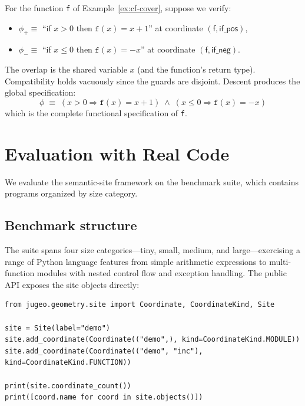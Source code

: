 \documentclass[11pt]{article}
\begin{document}
\begin{example}
For the function \texttt{f} of Example~\ref{ex:cf-cover}, suppose we verify:
\begin{itemize}[nosep]
  \item $\phi_+ \equiv$ ``if $x > 0$ then $\mathtt{f}(x) = x + 1$'' at
        coordinate $(\mathsf{f}, \mathsf{if\_pos})$,
  \item $\phi_- \equiv$ ``if $x \leq 0$ then $\mathtt{f}(x) = -x$'' at
        coordinate $(\mathsf{f}, \mathsf{if\_neg})$.
\end{itemize}
The overlap is the shared variable $x$ (and the function's return type).
Compatibility holds vacuously since the guards are disjoint.  Descent
produces the global specification:
\[
  \phi \;\equiv\; (x > 0 \Rightarrow \mathtt{f}(x) = x + 1) \;\wedge\;
                  (x \leq 0 \Rightarrow \mathtt{f}(x) = -x)
\]
which is the complete functional specification of \texttt{f}.
\end{example}

\section{Evaluation with Real Code}\label{sec:evaluation}

We evaluate the semantic-site framework on the \JuGeo{} benchmark suite,
which contains \compTotalPrograms{} programs organized by size category.

\subsection{Benchmark structure}

The suite spans four size categories---tiny, small, medium, and
large---exercising a range of Python language features from simple
arithmetic expressions to multi-function modules with nested control flow
and exception handling.
The public API exposes the site objects directly:

\begin{lstlisting}[style=jugeo-python,caption={A minimal semantic site in the public API.}]
from jugeo.geometry.site import Coordinate, CoordinateKind, Site

site = Site(label="demo")
site.add_coordinate(Coordinate(("demo",), kind=CoordinateKind.MODULE))
site.add_coordinate(Coordinate(("demo", "inc"), kind=CoordinateKind.FUNCTION))

print(site.coordinate_count())
print([coord.name for coord in site.objects()])
\end{lstlisting}
\end{document}
